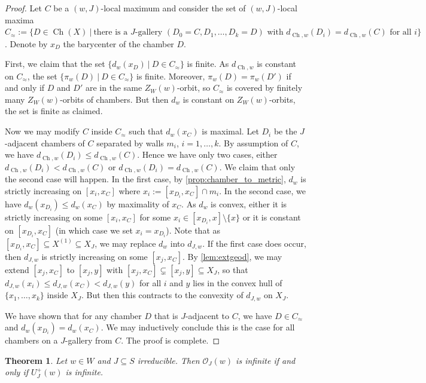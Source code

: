 \documentclass[a4paper, reqno, 14pt]{amsart}
\def\subset{\subseteq}
\def\co{\mathcal{O}}
\DeclareMathOperator{\Ch}{Ch}
\newtheorem{thm}{Theorem}[section]
\theoremstyle{definition}
\theoremstyle{remark}
\numberwithin{equation}{section}
\numberwithin{thm}{section}
\begin{document}
    \begin{proof}
        Let $C$ be a $(w,J)$-local maximum and consider the set of $(w,J)$-local maxima $C_{\approx}:=\{D\in \Ch(X)\ |\ \text{there is a $J$-gallery } (D_0=C,D_1,\dots,D_k=D) \text{ with } d_{\Ch,w}(D_i)=d_{\Ch,w}(C) \text{ for all }i\}$. Denote by $x_D$ the barycenter of the chamber $D$. 
        
        First, we claim that the set $\{d_w(x_D)\ |\ D\in C_{\approx}\}$ is finite. As $d_{\Ch,w}$ is constant on $C_{\approx}$, the set $\{\pi_w(D)\ |\ D\in C_{\approx}\}$ is finite. Moreover, $\pi_w(D)=\pi_w(D')$ if and only if $D$ and $D'$ are in the same $Z_W(w)$-orbit, so $C_{\approx}$ is covered by finitely many $Z_W(w)$-orbits of chambers. But then $d_w$ is constant on $Z_W(w)$-orbits, the set is finite as claimed.

        Now we may modify $C$ inside $C_{\approx}$ such that $d_w(x_C)$ is maximal. Let $D_i$ be the $J$-adjacent chambers of $C$ separated by walls $m_i$, $i=1,\dots,k$. By assumption of $C$, we have $d_{\Ch,w}(D_i)\leq d_{\Ch,w}(C)$. Hence we have only two cases, either $d_{\Ch,w}(D_i)<d_{\Ch,w}(C)$ or $d_{\Ch,w}(D_i)= d_{\Ch,w}(C)$. We claim that only the second case will happen. In the first case, by \cref{prop:chamber_to_metric}, $d_w$ is strictly increasing on $[x_i,x_C]$ where $x_i:=[x_{D_i},x_C]\cap m_i$. In the second case, we have $d_w(x_{D_i})\leq d_w(x_{C})$ by maximality of $x_C$. As $d_w$ is convex, either it is strictly increasing on some $[x_i,x_C]$ for some $x_i\in [x_{D_i},x]\setminus\{x\}$ or it is constant on $[x_{D_i},x_C]$ (in which case we set $x_i=x_{D_i}$). Note that as $[x_{D_i},x_C]\subset X^{(1)}\subset X_J$, we may replace $d_w$ into $d_{J,w}$. If the first case does occur, then $d_{J,w}$ is strictly increasing on some $[x_j,x_C]$. By \cref{lem:extgeod}, we may extend $[x_j,x_C]$ to $[x_j,y]$ with $[x_j,x_C]\subsetneq [x_j,y]\subset X_J$, so that $d_{J,w}(x_i)\leq d_{J,w}(x_C)<d_{J,w}(y)$ for all $i$ and $y$ lies in the convex hull of $\{x_1,\dots,x_k\}$ inside $X_J$. But then this contracts to the convexity of $d_{J,w}$ on $X_J$.

        We have shown that for any chamber $D$ that is $J$-adjacent to $C$, we have $D\in C_{\approx}$ and $d_w(x_{D_i})=d_w(x_{C})$. We may inductively conclude this is the case for all chambers on a $J$-gallery from $C$. The proof is complete. 

        
    \end{proof}

    \begin{thm}\label{thm:infU} Let $w\in W$ and $J\subset S$ irreducible. Then $\co_J(w)$ is infinite if and only if $U_J^+(w)$ is infinite.
    \end{thm}
\end{document}
